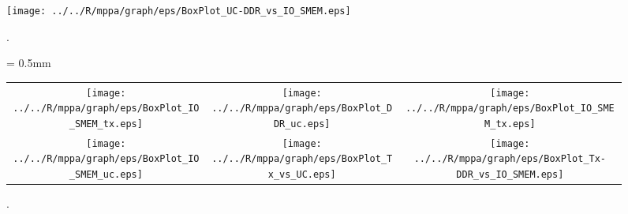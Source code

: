 \documentclass{sig-alternate-05-2015}
\begin{document}
\begin{figure}[t]
  \centering
  \texttt{[image: ../../R/mppa/graph/eps/BoxPlot\_UC-DDR\_vs\_IO\_SMEM.eps]}
  \caption{\label{fig:noc_routes}
    .}
\end{figure}

\begin{figure}[t]
  \tabcolsep = 0.5mm              %
  \begin{tabular}{ccc}
    \begin{minipage}[t]{0.32\textwidth}
      \texttt{[image: ../../R/mppa/graph/eps/BoxPlot\_IO\_SMEM\_tx.eps]}
      \vspace{-7mm}
      \caption{.}
      \label{fig:}
    \end{minipage}   
    &
    \begin{minipage}[t]{0.32\textwidth}
      \texttt{[image: ../../R/mppa/graph/eps/BoxPlot\_DDR\_uc.eps]}
      \vspace{-7mm}
      \caption{.}
      \label{fig:}
    \end{minipage}
    &
    \begin{minipage}[t]{0.32\textwidth}
      \texttt{[image: ../../R/mppa/graph/eps/BoxPlot\_IO\_SMEM\_tx.eps]}
      \vspace{-7mm}
      \caption{.}
      \label{fig:}
    \end{minipage}
    \\  
    \begin{minipage}[t]{0.32\textwidth}
      \texttt{[image: ../../R/mppa/graph/eps/BoxPlot\_IO\_SMEM\_uc.eps]}
      \vspace{-7mm}
      \caption{.}
      \label{fig:}
    \end{minipage}
    &
    \begin{minipage}[t]{0.32\textwidth}
      \texttt{[image: ../../R/mppa/graph/eps/BoxPlot\_Tx\_vs\_UC.eps]}
      \vspace{-7mm}
      \caption{.}
      \label{fig:}
    \end{minipage}
    &
    \begin{minipage}[t]{0.32\textwidth}
      \texttt{[image: ../../R/mppa/graph/eps/BoxPlot\_Tx-DDR\_vs\_IO\_SMEM.eps]}
      \vspace{-7mm}
      \caption{.}
      \label{fig:}
    \end{minipage}
    \vspace{-3mm}
  \end{tabular}
  \vspace{-2mm}
\end{figure}
\end{document}
